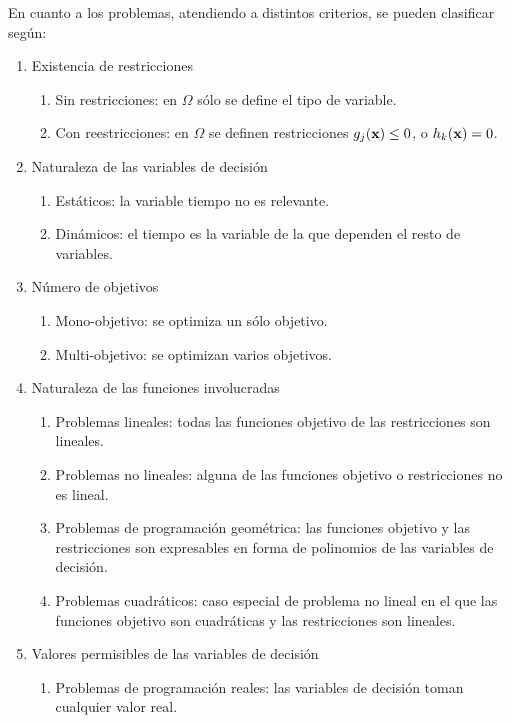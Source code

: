 En cuanto a los problemas, atendiendo a distintos criterios, se pueden clasificar según:
\begin{enumerate}
    \item Existencia de restricciones
        \begin{enumerate}
            \item Sin restricciones: en $\Omega$ sólo se define el tipo de variable.
            \item Con reestricciones: en $\Omega$ se definen restricciones $g_j(\textbf{x})\leq 0$, o $h_k(\textbf{x})=0$.
        \end{enumerate}
    \item Naturaleza de las variables de decisión
        \begin{enumerate}
            \item Estáticos: la variable tiempo no es relevante.
            \item Dinámicos: el tiempo es la variable de la que dependen el resto de variables.
        \end{enumerate}
    \item Número de objetivos
        \begin{enumerate}
            \item Mono-objetivo: se optimiza un sólo objetivo.
            \item Multi-objetivo: se optimizan varios objetivos.
        \end{enumerate}
    \item Naturaleza de las funciones involucradas
        \begin{enumerate}
            \item Problemas lineales: todas las funciones objetivo de las restricciones son lineales.
            \item Problemas no lineales: alguna de las funciones objetivo o restricciones no es lineal.
            \item Problemas de programación geométrica: las funciones objetivo y las restricciones son expresables en forma de polinomios de las variables de decisión.
            \item Problemas cuadráticos: caso especial de problema no lineal en el que las funciones objetivo son cuadráticas y las restricciones son lineales.
        \end{enumerate}
    \item Valores permisibles de las variables de decisión
        \begin{enumerate}
            \item Problemas de programación reales: las variables de decisión toman cualquier valor real.

\end{enumerate}
\end{enumerate}

